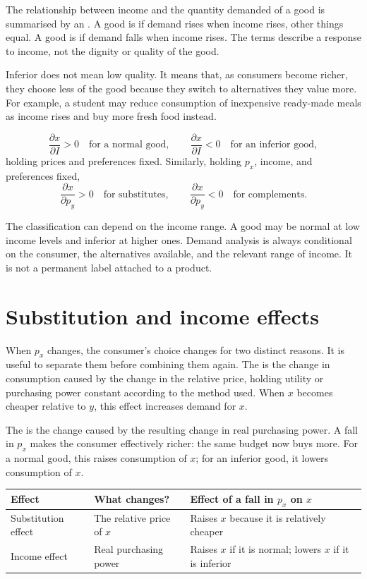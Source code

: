 The relationship between income and the quantity demanded of a good is
summarised by an . A good is  if demand
rises when income rises, other things equal. A good is  if
demand falls when income rises. The terms describe a response to income, not
the dignity or quality of the good.

Inferior does not mean low quality. It means that, as consumers become richer, they choose less of the good because they switch to alternatives they value more. For example, a student may reduce consumption of inexpensive ready-made meals as income rises and buy more fresh food instead.

\[
\frac{\partial x}{\partial I}>0
\quad\text{for a normal good},
\qquad
\frac{\partial x}{\partial I}<0
\quad\text{for an inferior good},
\]
holding prices and preferences fixed. Similarly, holding $p_x$, income, and
preferences fixed,
\[
\frac{\partial x}{\partial p_y}>0
\quad\text{for substitutes},
\qquad
\frac{\partial x}{\partial p_y}<0
\quad\text{for complements}.
\]

The classification can depend on the income range. A good may be normal at low
income levels and inferior at higher ones. Demand analysis is always
conditional on the consumer, the alternatives available, and the relevant
range of income. It is not a permanent label attached to a product.

\section{Substitution and income effects}

When $p_x$ changes, the consumer's choice changes for two distinct reasons.
It is useful to separate them before combining them again. The
 is the change in consumption caused by the
change in the relative price, holding utility or purchasing power constant
according to the method used. When $x$ becomes cheaper relative to $y$, this
effect increases demand for $x$.

The  is the change caused by the resulting change in
real purchasing power. A fall in $p_x$ makes the consumer effectively richer:
the same budget now buys more. For a normal good, this raises consumption of
$x$; for an inferior good, it lowers consumption of $x$.

\begin{center}
\renewcommand{\arraystretch}{1.18}
\begin{tabular}{p{}p{}p{}}
\toprule
Effect & What changes? & Effect of a fall in $p_x$ on $x$ \\
\midrule
Substitution effect & The relative price of $x$ & Raises $x$ because it is relatively cheaper \\
Income effect & Real purchasing power & Raises $x$ if it is normal; lowers $x$ if it is inferior \\
\bottomrule
\end{tabular}
\end{center}

